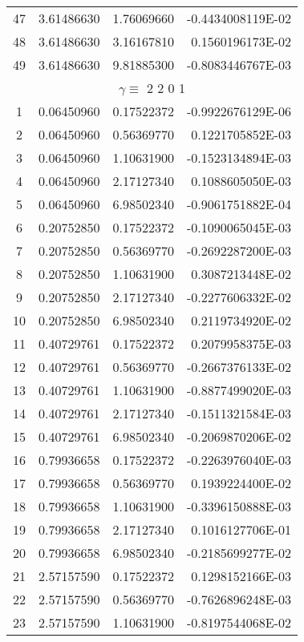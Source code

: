 \begin{longtable}{@{\extracolsep{\fill}}cllr@{}}
47  &  3.61486630  &  1.76069660  &  -0.4434008119E-02 \\
48  &  3.61486630  &  3.16167810  &   0.1560196173E-02 \\
49  &  3.61486630  &  9.81885300  &  -0.8083446767E-03 \\
\midrule
\multicolumn{4}{c}{ $\gamma \equiv $  2 2 0 1} \\
\midrule
1  &  0.06450960  &  0.17522372  &  -0.9922676129E-06 \\
2  &  0.06450960  &  0.56369770  &   0.1221705852E-03 \\
3  &  0.06450960  &  1.10631900  &  -0.1523134894E-03 \\
4  &  0.06450960  &  2.17127340  &   0.1088605050E-03 \\
5  &  0.06450960  &  6.98502340  &  -0.9061751882E-04 \\
6  &  0.20752850  &  0.17522372  &  -0.1090065045E-03 \\
7  &  0.20752850  &  0.56369770  &  -0.2692287200E-03 \\
8  &  0.20752850  &  1.10631900  &   0.3087213448E-02 \\
9  &  0.20752850  &  2.17127340  &  -0.2277606332E-02 \\
10  &  0.20752850  &  6.98502340  &   0.2119734920E-02 \\
11  &  0.40729761  &  0.17522372  &   0.2079958375E-03 \\
12  &  0.40729761  &  0.56369770  &  -0.2667376133E-02 \\
13  &  0.40729761  &  1.10631900  &  -0.8877499020E-03 \\
14  &  0.40729761  &  2.17127340  &  -0.1511321584E-03 \\
15  &  0.40729761  &  6.98502340  &  -0.2069870206E-02 \\
16  &  0.79936658  &  0.17522372  &  -0.2263976040E-03 \\
17  &  0.79936658  &  0.56369770  &   0.1939224400E-02 \\
18  &  0.79936658  &  1.10631900  &  -0.3396150888E-03 \\
19  &  0.79936658  &  2.17127340  &   0.1016127706E-01 \\
20  &  0.79936658  &  6.98502340  &  -0.2185699277E-02 \\
21  &  2.57157590  &  0.17522372  &   0.1298152166E-03 \\
22  &  2.57157590  &  0.56369770  &  -0.7626896248E-03 \\
23  &  2.57157590  &  1.10631900  &  -0.8197544068E-02 \\

\end{longtable}
